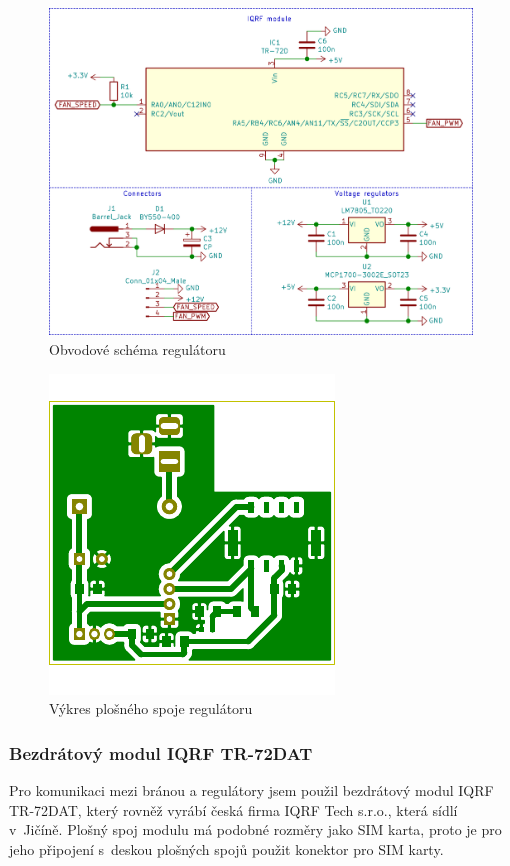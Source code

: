 \documentclass[12pt,a4paper]{article}
\begin{document}
\begin{figure}[H]
\centering
\label{fig:schematic/fan-regulator}
\includegraphics[width = 128mm]{../img/kicad/fan-regulator-schema.png}
\caption{Obvodové schéma regulátoru}
\end{figure}

\begin{figure}[H]
\centering
\label{fig:board/fan-regulator}
\includegraphics{../img/kicad/fan-regulator-board.pdf}
\caption{Výkres plošného spoje regulátoru}
\end{figure}

\subsubsection{Bezdrátový modul IQRF TR-72DAT}

Pro komunikaci mezi bránou a regulátory jsem použil bezdrátový modul IQRF TR-72DAT, který rovněž vyrábí česká firma IQRF Tech s.r.o., která sídlí v~Jičíně. Plošný spoj modulu má podobné rozměry jako SIM karta, proto je pro jeho připojení s~deskou plošných spojů použit konektor pro SIM karty.
\end{document}
